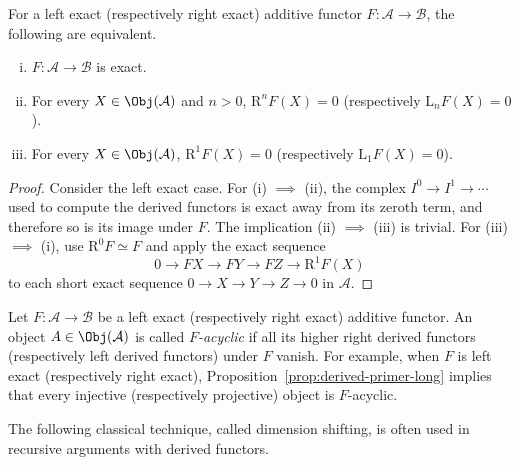 \begin{corollary}\label{prop:obstruction-exactness}
	For a left exact (respectively right exact) additive functor
	$F:\mathcal{A}\to\mathcal{B}$, the following are equivalent.
	\begin{enumerate}[(i)]
		\item $F:\mathcal{A}\to\mathcal{B}$ is exact.
		\item For every $X\in\Obj(\mathcal{A})$ and $n>0$,
		$\mathrm{R}^nF(X)=0$ (respectively $\mathrm{L}_nF(X)=0$).
		\item For every $X\in\Obj(\mathcal{A})$,
		$\mathrm{R}^1F(X)=0$ (respectively $\mathrm{L}_1F(X)=0$).
	\end{enumerate}
\end{corollary}
\begin{proof}
	Consider the left exact case. For (i) $\implies$ (ii), the complex
	$I^0\to I^1\to\cdots$ used to compute the derived functors is exact away
	from its zeroth term, and therefore so is its image under $F$. The
	implication (ii) $\implies$ (iii) is trivial. For (iii) $\implies$ (i), use
	$\mathrm{R}^0F\simeq F$ and apply the exact sequence
	\[ 0 \to FX \to FY \to FZ \to \mathrm{R}^1 F(X) \]
	to each short exact sequence $0\to X\to Y\to Z\to0$ in $\mathcal{A}$.
\end{proof}

\begin{convention}\label{con:F-acyclic}
	Let $F:\mathcal{A}\to\mathcal{B}$ be a left exact (respectively right
	exact) additive functor. An object $A\in\Obj(\mathcal{A})$ is called
	\emph{$F$-acyclic} if all its higher right derived functors (respectively
	left derived functors) under $F$ vanish. For example, when $F$ is left
	exact (respectively right exact), Proposition~\ref{prop:derived-primer-long}
	implies that every injective (respectively projective) object is
	$F$-acyclic.
\end{convention}

The following classical technique, called dimension shifting, is often used in
recursive arguments with derived functors.

